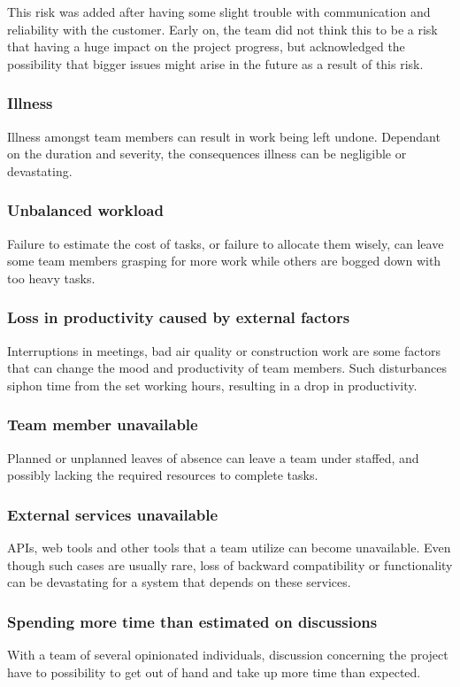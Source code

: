 This risk was added after having some slight trouble with communication and reliability with the customer. Early on, the team did not think this to be a risk that having a huge impact on the project progress, but acknowledged the possibility that bigger issues might arise in the future as a result of this risk.

\subsubsection{Illness}
Illness amongst team members can result in work being left undone. Dependant on the duration and severity, the consequences illness can be negligible or devastating. 

\subsubsection{Unbalanced workload}
Failure to estimate the cost of tasks, or failure to allocate them wisely, can leave some team members grasping for more work while others are bogged down with too heavy tasks.

\subsubsection{Loss in productivity caused by external factors}
Interruptions in meetings, bad air quality or construction work are some factors that can change the mood and productivity of team members. Such disturbances siphon time from the set working hours, resulting in a drop in productivity. 

\subsubsection{Team member unavailable}
Planned or unplanned leaves of absence can leave a team under staffed, and possibly lacking the required resources to complete tasks.

\subsubsection{External services unavailable}
APIs, web tools and other tools that a team utilize can become unavailable. Even though such cases are usually rare, loss of backward compatibility or functionality can be devastating for a system that depends on these services.

\subsubsection{Spending more time than estimated on discussions}
With a team of several opinionated individuals, discussion concerning the project have to possibility to get out of hand and take up more time than expected.

